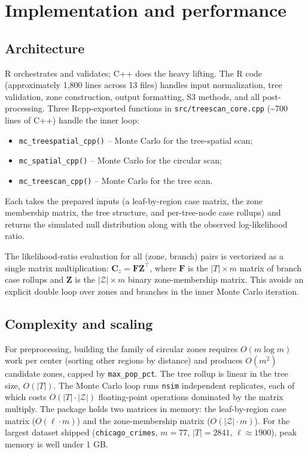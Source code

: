 \hypertarget{sec-implementation}{%
\section{Implementation and performance}\label{sec-implementation}}

\hypertarget{architecture}{%
\subsection{Architecture}\label{architecture}}

R orchestrates and validates; C++ does the heavy lifting. The R code
(approximately 1,800 lines across 13 files) handles input normalization,
tree validation, zone construction, output formatting, S3 methods, and
all post-processing. Three Rcpp-exported functions in
\texttt{src/treescan\_core.cpp} (\textasciitilde700 lines of C++) handle the inner loop:

\begin{itemize}
\tightlist
\item
  \texttt{mc\_treespatial\_cpp()} -- Monte Carlo for the tree-spatial scan;
\item
  \texttt{mc\_spatial\_cpp()} -- Monte Carlo for the circular scan;
\item
  \texttt{mc\_treescan\_cpp()} -- Monte Carlo for the tree scan.
\end{itemize}

Each takes the prepared inputs (a leaf-by-region case matrix, the zone
membership matrix, the tree structure, and per-tree-node case rollups) and
returns the simulated null distribution along with the observed
log-likelihood ratio.

The likelihood-ratio evaluation for all (zone, branch) pairs is vectorized
as a single matrix multiplication: \(\mathbf{C}_z = \mathbf{F} \mathbf{Z}^\top\),
where \(\mathbf{F}\) is the \(|T| \times m\) matrix of branch case rollups and
\(\mathbf{Z}\) is the \(|\mathcal{Z}| \times m\) binary zone-membership matrix.
This avoids an explicit double loop over zones and branches in the inner
Monte Carlo iteration.

\hypertarget{complexity-and-scaling}{%
\subsection{Complexity and scaling}\label{complexity-and-scaling}}

For preprocessing, building the family of circular zones requires
\(O(m \log m)\) work per center (sorting other regions by distance) and
produces \(O(m^2)\) candidate zones, capped by \texttt{max\_pop\_pct}. The tree
rollup is linear in the tree size, \(O(|T|)\). The Monte Carlo loop runs
\texttt{nsim} independent replicates, each of which costs \(O(|T| \cdot |\mathcal{Z}|)\)
floating-point operations dominated by the matrix multiply. The package
holds two matrices in memory: the leaf-by-region case matrix
(\(O(\ell \cdot m)\)) and the zone-membership matrix
(\(O(|\mathcal{Z}| \cdot m)\)). For the largest dataset shipped
(\texttt{chicago\_crimes}, \(m = 77\), \(|T| = 2841\), \(\ell \approx 1900\)), peak
memory is well under 1 GB.


